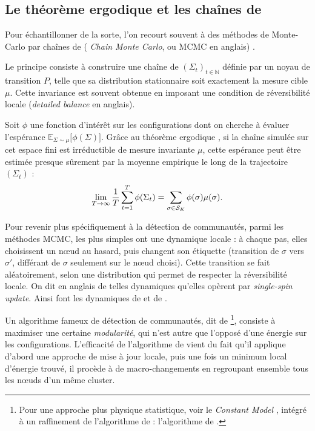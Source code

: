 \subsection{Le théorème ergodique et les chaînes de }

Pour échantillonner de la sorte, l'on recourt souvent à des méthodes de Monte-Carlo par chaînes de  (\emph{ Chain Monte Carlo}, ou MCMC en anglais) \cite{Robert1996MCMC,JustinSaintFlour2025}.

Le principe consiste à construire une chaîne de  $(\Sigma_t)_{t\in\mathbb{N}}$ définie par un noyau de transition $P$, telle que sa distribution stationnaire soit exactement la mesure cible $\mu$. Cette invariance est souvent obtenue en imposant une condition de réversibilité locale (\emph{detailed balance} en anglais).

Soit $\phi$ une fonction d'intérêt sur les configurations dont on cherche à évaluer l'espérance $ \mathbb E_{\Sigma \sim \mu} \bigl[ \phi(\Sigma)\bigr]$.
Grâce au théorème ergodique \cite{JustinSaintFlour2025}, si la chaîne simulée sur cet espace fini est irréductible de mesure invariante $\mu$, cette espérance peut être estimée presque sûrement par la moyenne empirique le long de la trajectoire $(\Sigma_t)$ :
\[
\lim_{T\to\infty} \frac{1}{T} \sum_{t=1}^T \phi(\Sigma_t) = \sum_{\sigma \in \mathcal S_K} \phi(\sigma)\mu(\sigma). 
\]

Pour revenir plus spécifiquement à la détection de communautés, parmi les méthodes MCMC, les plus simples ont une dynamique locale : à chaque pas, elles choisissent un nœud au hasard, puis changent son étiquette (transition de $\sigma $ vers $\sigma'$, différant de $\sigma$ seulement sur le nœud choisi). Cette transition se fait aléatoirement, selon une distribution qui permet de respecter la réversibilité locale.
On dit en anglais de telles dynamiques qu'elles opèrent par \emph{single-spin update}.
Ainsi font les dynamiques de  et de  \cite{GlauberMetropolisDiaconis2009}.


Un algorithme fameux de détection de communautés, dit de  \cite{Louvain2008}\footnote{Pour une approche plus physique statistique, voir le \emph{Constant  Model} \cite{ConstantPottsModel}, intégré à un raffinement de l'algorithme de  : l'algorithme de  \cite{Leiden2019}.}, consiste à maximiser une certaine \emph{modularité}, qui n'est autre que l'opposé d'une énergie sur les configurations.
L'efficacité de l'algorithme de   vient du fait qu'il applique d'abord une approche de mise à jour locale, puis une fois un minimum local d'énergie trouvé, il procède à de macro-changements en regroupant ensemble tous les nœuds d'un même cluster. 

